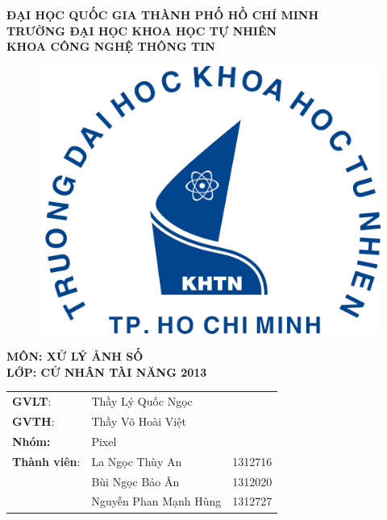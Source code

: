 \documentclass{article}
\begin{document}
\begin{titlepage}
	\begin{center}
		\large{\textbf{ĐẠI HỌC QUỐC GIA THÀNH PHỐ HỒ CHÍ MINH}}\\
		\large{\textbf{TRƯỜNG ĐẠI HỌC KHOA HỌC TỰ NHIÊN}}\\
		\large{\textbf{KHOA CÔNG NGHỆ THÔNG TIN}}\\
		
		\begin{figure}[H]
			\centerline{\includegraphics[scale = 0.5]{logo}}
		\end{figure}
		\vfill
		
		\large{\textbf{MÔN: XỬ LÝ ẢNH SỐ }}\\
		\large{\textbf{LỚP: CỬ NHÂN TÀI NĂNG 2013}}\\
	\end{center}
	\vfill
	
	\vfill
	
	\begin{flushright}
		\begin{tabular}{l l l}
			\textbf{GVLT}: & Thầy Lý Quốc Ngọc\\
			\textbf{GVTH}: & Thầy Võ Hoài Việt\\
			\textbf{Nhóm:} & Pixel\\
			\textbf{Thành viên}: & La Ngọc Thùy An & 1312716\\
			& Bùi Ngọc Bảo Ân & 1312020\\
			& Nguyễn Phan Mạnh Hùng & 1312727\\
		\end{tabular}
	\end{flushright}
\end{titlepage}
\pagebreak
\end{document}
